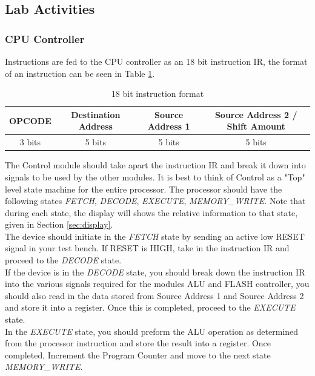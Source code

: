 \subsection{Lab Activities}


\subsubsection{CPU Controller}
\label{sec:control}
Instructions are fed to the CPU controller as an 18 bit instruction IR, the format of an instruction can be seen in Table \ref{tab:instruct}. 

\begin{table}[H]
	\caption{18 bit instruction format}
	\label{tab:instruct}
	\begin{center}
		\begin{tabular}{| c | c | c | c |}
			\hline
			{\bf OPCODE} & {\bf Destination Address} & {\bf Source Address 1} & {\bf Source Address 2 / Shift Amount} \\ \hline
			3 bits & 5 bits & 5 bits & 5 bits \\ 
			\hline
		\end{tabular}
	\end{center}
\end{table}

The Control module should take apart the instruction IR and break it down into signals to be used by the other modules. It is best to think of Control as a "Top" level state machine for the entire processor. The processor should have the following states \emph{FETCH}, \emph{DECODE}, \emph{EXECUTE}, \emph{MEMORY\_WRITE}. Note that during each state, the display will shows the relative information to that state, given in Section \ref{sec:display}. \\ 

The device should initiate in the \emph{FETCH} state by sending an active low RESET signal in your test bench. If RESET is HIGH, take in the instruction IR and proceed to the \emph{DECODE} state. \\

If the device is in the \emph{DECODE} state, you should break down the instruction IR into the various signals required for the modules ALU and FLASH controller, you should also read in the data stored from Source Address 1 and Source Address 2 and store it into a register. Once this is completed,  proceed to the \emph{EXECUTE} state. \\

In the \emph{EXECUTE} state, you should preform the ALU operation as determined from the processor instruction and store the result into a register. Once completed, Increment the Program Counter and move to the next state \emph{MEMORY\_WRITE}. \\

